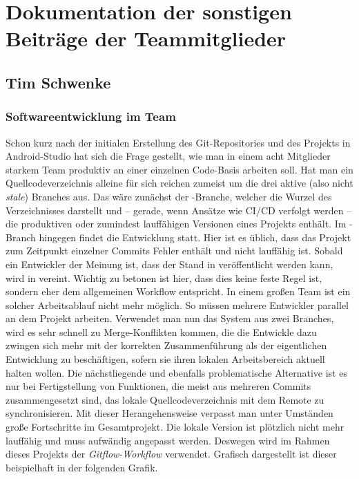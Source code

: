 \section{Dokumentation der sonstigen Beiträge der Teammitglieder}


\subsection{Tim Schwenke}

\subsubsection{Softwareentwicklung im Team}

Schon kurz nach der initialen Erstellung des Git-Repositories und des Projekts in Android-Studio hat sich die Frage gestellt, wie man in einem acht Mitglieder starkem Team produktiv an einer einzelnen Code-Basis arbeiten soll. Hat man ein Quellcodeverzeichnis alleine für sich reichen zumeist um die drei aktive (also nicht \textit{stale}) Branches aus. Das wäre zunächst der -Branche, welcher die Wurzel des Verzeichnisses darstellt und – gerade, wenn Ansätze wie CI/CD verfolgt werden – die produktiven oder zumindest lauffähigen Versionen eines Projekts enthält. Im -Branch hingegen findet die Entwicklung statt. Hier ist es üblich, dass das Projekt zum Zeitpunkt einzelner Commits Fehler enthält und nicht lauffähig ist. Sobald ein Entwickler der Meinung ist, dass der Stand in  veröffentlicht werden kann, wird  in  vereint. Wichtig zu betonen ist hier, dass dies keine feste Regel ist, sondern eher dem allgemeinen Workflow entspricht. In einem großen Team ist ein solcher Arbeitsablauf nicht mehr möglich. So müssen mehrere Entwickler parallel an dem Projekt arbeiten. Verwendet man nun das System aus zwei Branches, wird es sehr schnell zu Merge-Konflikten kommen, die die Entwickle dazu zwingen sich mehr mit der korrekten Zusammenführung als der eigentlichen Entwicklung zu beschäftigen, sofern sie ihren lokalen Arbeitsbereich aktuell halten wollen. Die nächstliegende und ebenfalls problematische Alternative ist es nur bei Fertigstellung von Funktionen, die meist aus mehreren Commits zusammengesetzt sind, das lokale Quellcodeverzeichnis mit dem Remote zu synchronisieren. Mit dieser Herangehensweise verpasst man unter Umständen große Fortschritte im Gesamtprojekt. Die lokale Version ist plötzlich nicht mehr lauffähig und muss aufwändig angepasst werden. Deswegen wird im Rahmen dieses Projekts der\textit{ Gitflow-Workflow} verwendet. Grafisch dargestellt ist dieser beispielhaft in der folgenden Grafik.

